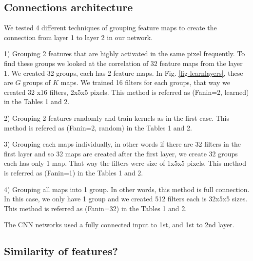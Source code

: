 \documentclass{article} %
\begin{document}
\subsection{Connections architecture}
We tested 4 different techniques of grouping feature maps to create the connection from layer 1 to layer 2 in our network.

1) Grouping 2 features that are highly activated in the same pixel frequently. To find these groups we looked at the correlation of 32 feature maps from the layer 1. We created 32 groups, each has 2 feature maps. In Fig. \ref{fig-learnlayers}, these are $G$ groups of $K$ maps. We trained 16 filters for each groups, that way we created 32 x16 filters, 2x5x5 pixels. This method is  referred as  (Fanin=2, learned) in the Tables 1 and 2. 

2)  Grouping 2 features  randomly and train kernels as in the first case.  This method is  refered as  (Fanin=2, random) in the Tables 1 and 2.

3) Grouping each maps individually, in other words if there are 32 filters in the first layer and so 32 maps are created after the first layer, we create 32 groups each has only 1 map. That way the filters were size of 1x5x5 pixels. This method is  referred as  (Fanin=1) in the Tables 1 and 2.

4) Grouping all maps into 1 group. In other words, this method is full connection. In this case, we only have 1 group and we created 512 filters each is 32x5x5 sizes. This method is  referred as  (Fanin=32) in the Tables 1 and 2.

The CNN networks used a fully connected input to 1st, and 1st to 2nd layer.




\subsection{Similarity of features?}
\end{document}
